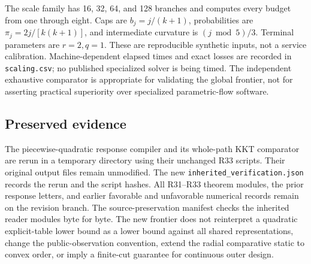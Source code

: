 The scale family has 16, 32, 64, and 128 branches and computes every budget from one through eight. Caps are $b_j=j/(k+1)$, probabilities are $\pi_j=2j/[k(k+1)]$, and intermediate curvature is $(j\bmod 5)/3$. Terminal parameters are $r=2,q=1$. These are reproducible synthetic inputs, not a service calibration. Machine-dependent elapsed times and exact losses are recorded in \texttt{scaling.csv}; no published specialized solver is being timed. The independent exhaustive comparator is appropriate for validating the global frontier, not for asserting practical superiority over specialized parametric-flow software.

\subsection{Preserved evidence}
The piecewise-quadratic response compiler and its whole-path KKT comparator are rerun in a temporary directory using their unchanged R33 scripts. Their original output files remain unmodified. The new \texttt{inherited\_verification.json} records the rerun and the script hashes. All R31--R33 theorem modules, the prior response letters, and earlier favorable and unfavorable numerical records remain on the revision branch. The source-preservation manifest checks the inherited reader modules byte for byte. The new frontier does not reinterpret a quadratic explicit-table lower bound as a lower bound against all shared representations, change the public-observation convention, extend the radial comparative static to convex order, or imply a finite-cut guarantee for continuous outer design.
